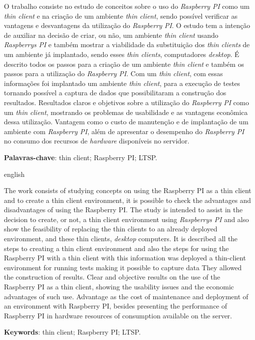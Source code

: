 \documentclass[
	12pt,				%
	openright,			%
	twoside,			%
	a4paper,			%
	chapter=TITLE,		%
	english,			%
	brazil				%
	]{abntex2}
\begin{document}
\setlength{\absparsep}{18pt} %
\begin{resumo}
O trabalho consiste no estudo de conceitos sobre o uso do \textit{Raspberry PI} como um \textit{thin client} e na criação de um ambiente \textit{thin client}, sendo possível verificar as vantagens e desvantagens da utilização do \textit{Raspberry PI}. O estudo tem a intenção de auxiliar na decisão de criar, ou não, um ambiente \textit{thin client} usando \textit{Raspberrys PI} e também mostrar a viabilidade da substituição  dos \textit{thin clients} de um ambiente já implantado, sendo esses \textit{thin clients}, computadores \textit{desktop}. É descrito todos os passos para a criação de um ambiente \textit{thin client} e também os passos para a utilização do \textit{Raspberry PI}. Com um \textit{thin client}, com essas informações foi implantado um ambiente \textit{thin client}, para a execução de testes tornando possível a captura de dados que possibilitaram a construção dos resultados. Resultados claros e objetivos sobre a utilização do \textit{Raspberry PI} como um \textit{thin client}, mostrando os problemas de usabilidade e as vantagens econômica dessa utilização. Vantagem como o custo de manutenção e de implantação de um ambiente com \textit{Raspberry PI}, além de apresentar o desempenho do \textit{Raspberry PI} no consumo dos recursos de \textit{hardware} disponíveis no servidor.


 \textbf{Palavras-chave}: thin client; Raspberry PI; LTSP.	%
\end{resumo}

\begin{resumo}[Abstract]
 \begin{otherlanguage*}{english}
   
   The work consists of studying concepts on using the Raspberry PI as a thin client and to create a thin client environment, it is possible to check the advantages and disadvantages of using the Raspberry PI. The study is intended to assist in the decision to create, or not, a thin client environment using \textit{Raspberrys PI} and also show the feasibility of replacing the thin clients to an already deployed environment, and these thin clients, \textit{desktop} computers. It is described all the steps to creating a thin client environment and also the steps for using the Raspberry PI with a thin client with this information was deployed a thin-client environment for running tests making it possible to capture data They allowed the construction of results. Clear and objective results on the use of the Raspberry PI as a thin client, showing the usability issues and the economic advantages of such use. Advantage as the cost of maintenance and deployment of an environment with Raspberry PI, besides presenting the performance of Raspberry PI in hardware resources of consumption available on the server.

   \vspace{\onelineskip}
 
   \noindent 
   \textbf{Keywords}: thin client; Raspberry PI; LTSP.
 \end{otherlanguage*}
\end{resumo}
\end{document}

